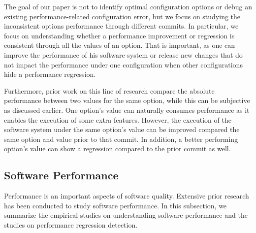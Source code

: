 The goal of our paper is not to identify optimal configuration options or debug an existing performance-related configuration error, but we focus on studying the inconsistent options performance through different commits. In particular, we focus on understanding whether a performance improvement or regression is consistent through all the values of an option. That is important, as one can improve the performance of his software system or release new changes that do not impact the performance under one configuration when other configurations hide a performance regression. 

Furthermore, prior work on this line of research compare the absolute performance between two values for the same option, while this can be subjective as discussed earlier. One option's value can naturally consumes performance as it enables the execution of some extra features. However, the execution of the software system under the same option's value can be improved compared the same option and value prior to that commit. In addition, a better performing option's value can show a regression compared to the prior commit as well. %

\subsection{Software Performance}

Performance is an important aspects of software quality. Extensive prior research has been conducted to study software performance. In this subsection, we summarize the empirical studies on  %
understanding software performance and the studies on %
performance regression detection.

